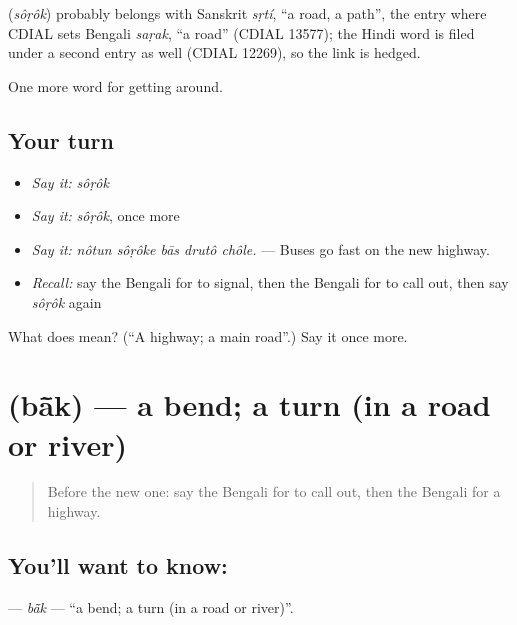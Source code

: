 \begin{cousinweb}
\textbf{} (\emph{sôṛôk}) probably belongs with Sanskrit \emph{sṛtí}, \textquotedblleft{}a road, a path\textquotedblright{}, the entry where CDIAL sets Bengali \emph{saṛak}, \textquotedblleft{}a road\textquotedblright{} (CDIAL 13577); the Hindi word is filed under a second entry as well (CDIAL 12269), so the link is hedged.
\end{cousinweb}

\begin{grammarlens}[title={What you've built}]
One more word for getting around.
\end{grammarlens}

\subsection*{Your turn}
\begin{itemize}
\raggedright
  \item \emph{Say it:} \emph{sôṛôk}
  \item \emph{Say it:} \emph{sôṛôk}, once more
  \item \emph{Say it:} \emph{nôtun sôṛôke bās drutô chôle.} — Buses go fast on the new highway.
  \item \emph{Recall:} say the Bengali for to signal, then the Bengali for to call out, then say \emph{sôṛôk} again
\end{itemize}

\begin{tcolorbox}[breakable,colback=teal!4,colframe=teal!35!black,title={Before you move on}]
What does  mean? (\textquotedblleft{}A highway; a main road\textquotedblright{}.) Say it once more.
\end{tcolorbox}
\section[\texorpdfstring{\bn{বাঁক} (bā̃k)}{বাঁক (bā̃k)}]{ (bā̃k) — a bend; a turn (in a road or river)}

\label{lesson:BN-C390-bak}



\begin{quote}
Before the new one: say the Bengali for to call out, then the Bengali for a highway.
\end{quote}

\subsection*{You'll want to know: }
\textbf{} — \emph{bā̃k} — \textquotedblleft{}a bend; a turn (in a road or river)\textquotedblright{}.

